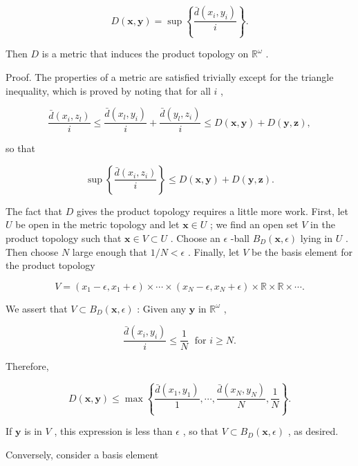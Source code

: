 \documentclass[10pt]{article}
\begin{document}
\[
D\left( {\mathbf{x},\mathbf{y}}\right)  = \sup \left\{  \frac{\bar{d}\left( {{x}_{i},{y}_{i}}\right) }{i}\right\}  .
\]

Then \(D\) is a metric that induces the product topology on \({\mathbb{R}}^{\omega }\) .

Proof. The properties of a metric are satisfied trivially except for the triangle inequality, which is proved by noting that for all \(i\) ,

\[
\frac{\bar{d}\left( {{x}_{i},{z}_{l}}\right) }{i} \leq  \frac{\bar{d}\left( {{x}_{l},{y}_{i}}\right) }{i} + \frac{\bar{d}\left( {{y}_{l},{z}_{i}}\right) }{i} \leq  D\left( {\mathbf{x},\mathbf{y}}\right)  + D\left( {\mathbf{y},\mathbf{z}}\right) ,
\]

so that

\[
\sup \left\{  \frac{\bar{d}\left( {{x}_{i},{z}_{i}}\right) }{i}\right\}   \leq  D\left( {\mathbf{x},\mathbf{y}}\right)  + D\left( {\mathbf{y},\mathbf{z}}\right) .
\]

The fact that \(D\) gives the product topology requires a little more work. First, let \(U\) be open in the metric topology and let \(\mathbf{x} \in  U\) ; we find an open set \(V\) in the product topology such that \(\mathbf{x} \in  V \subset  U\) . Choose an \(\epsilon\) -ball \({B}_{D}\left( {\mathbf{x},\epsilon }\right)\) lying in \(U\) . Then choose \(N\) large enough that \(1/N < \epsilon\) . Finally, let \(V\) be the basis element for the product topology

\[
V = \left( {{x}_{1} - \epsilon ,{x}_{1} + \epsilon }\right)  \times  \cdots  \times  \left( {{x}_{N} - \epsilon ,{x}_{N} + \epsilon }\right)  \times  \mathbb{R} \times  \mathbb{R} \times  \cdots .
\]

We assert that \(V \subset  {B}_{D}\left( {\mathbf{x},\epsilon }\right)\) : Given any \(\mathbf{y}\) in \({\mathbb{R}}^{\omega }\) ,

\[
\frac{\bar{d}\left( {{x}_{i},{y}_{i}}\right) }{i} \leq  \frac{1}{N}\;\text{ for }i \geq  N.
\]

Therefore,

\[
D\left( {\mathbf{x},\mathbf{y}}\right)  \leq  \max \left\{  {\frac{\bar{d}\left( {{x}_{1},{y}_{1}}\right) }{1},\cdots ,\frac{\bar{d}\left( {{x}_{N},{y}_{N}}\right) }{N},\frac{1}{N}}\right\}  .
\]

If \(\mathbf{y}\) is in \(V\) , this expression is less than \(\epsilon\) , so that \(V \subset  {B}_{D}\left( {\mathbf{x},\epsilon }\right)\) , as desired.

Conversely, consider a basis element
\end{document}
